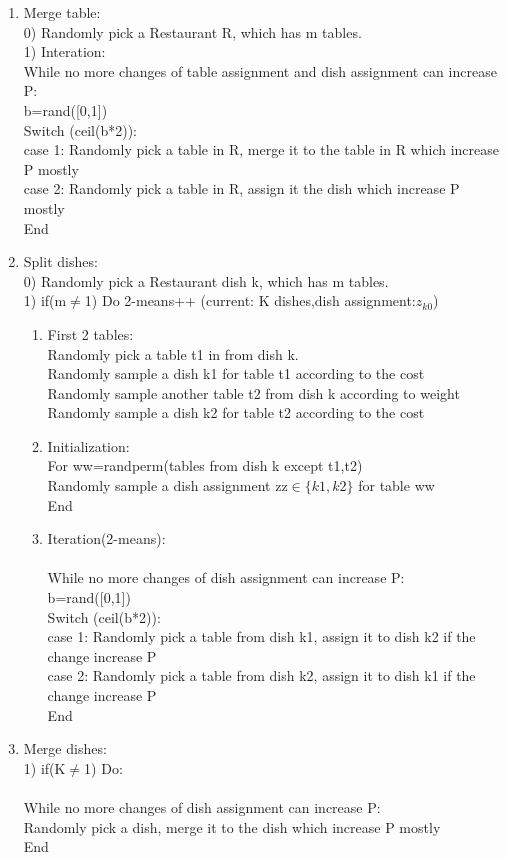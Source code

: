 \documentclass{article}
\begin{document}
\begin{enumerate}
\item Merge table:\\
0) Randomly pick a Restaurant R, which has m tables.\\
1) Interation:\\
 While no more changes of table assignment and dish assignment can increase P:\\
 b=rand([0,1]) \\
 Switch (ceil(b*2)):\\
 case 1: Randomly pick a table in R, merge it to the table in R which increase P mostly\\
 case 2: Randomly pick a table in R, assign it the dish which increase P mostly\\
 End\\


\item Split dishes:\\
0) Randomly pick a Restaurant dish k, which has m tables.\\
1) if(m$\neq$1) Do 2-means++ (current: K dishes,dish assignment:$z_{k0}$)\\
\begin{enumerate}
\item First 2 tables:\\
Randomly pick a table t1 in from dish k.\\
Randomly sample a dish k1 for table t1 according to the cost \\
Randomly sample another table t2 from dish k according to weight\\
Randomly sample a dish k2 for table t2 according to the cost 
\item Initialization:\\
For ww=randperm(tables from dish k except t1,t2) \\ 
Randomly sample a dish assignment zz$\in\{k1,k2\}$ for table ww\\
End 
\item Iteration(2-means):\\ \\
While no more changes of dish assignment can increase P:\\
b=rand([0,1]) \\
Switch (ceil(b*2)):\\
case 1: Randomly pick a table from dish k1, assign it to dish k2 if the change increase P\\
case 2: Randomly pick a table from dish k2, assign it to dish k1 if the change increase P\\
End
\end{enumerate}  

\item Merge dishes:\\
1) if(K$\neq$1) Do: \\ \\
 While no more changes of dish assignment can increase P:\\
 Randomly pick a dish, merge it to the dish which increase P mostly\\
 End\\
\end{enumerate}  
\end{document}
